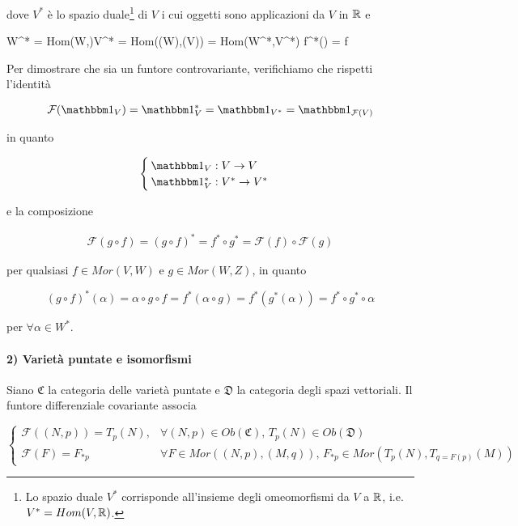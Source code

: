 dove $ V^{*} $ è lo spazio duale\footnote{%
	Lo spazio duale $ V^{*} $ corrisponde all'insieme degli omeomorfismi da $ V $ a $ \mathbb{R} $, i.e. $ V^{*} = Hom(V,\mathbb{R}) $.%
} di $ V $ i cui oggetti sono applicazioni da $ V $ in $ \mathbb{R} $ e

	{W^{*} = Hom(W,\R)}{V^{*} = Hom((W),(V)) = Hom(W^{*},V^{*})}
	{\alpha}{f^{*}(\alpha) = \alpha \circ f}

Per dimostrare che sia un funtore controvariante, verifichiamo che rispetti l'identità

\begin{align}
	\mathcal{F}(\bigone_{V}) = \bigone_{V}^{*} %
	= \bigone_{V^{*}} %
	= \bigone_{\mathcal{F}(V)}
\end{align}

in quanto

\begin{equation}
	\begin{cases}
		\bigone_{V} : V \to V\\
		\bigone_{V}^{*} : V^{*} \to V^{*}
	\end{cases}
\end{equation}

e la composizione

\begin{align}
	\mathcal{F}(g \circ f) = (g \circ f)^{*} %
	= f^{*} \circ g^{*} %
	= \mathcal{F}(f) \circ \mathcal{F}(g)
\end{align}

per qualsiasi $ f \in Mor(V,W) $ e $ g \in Mor(W,Z) $, in quanto

\begin{equation}
	(g \circ f)^{*}(\alpha) = \alpha \circ g \circ f %
	= f^{*} (\alpha \circ g) %
	= f^{*} (g^{*}(\alpha)) %
	= f^{*} \circ g^{*} \circ \alpha
\end{equation}

per $ \forall \alpha \in W^{*} $.

\paragraph{2) Varietà puntate e isomorfismi}

Siano $ \mathfrak{C} $ la categoria delle varietà puntate e $ \mathfrak{D} $ la categoria degli spazi vettoriali. Il funtore differenziale covariante associa

\begin{equation}
	\begin{cases}
		\mathcal{F}((N,p)) = T_{p}(N), & \forall (N,p) \in Ob(\mathfrak{C}), \, T_{p}(N) \in Ob(\mathfrak{D})\\
		\mathcal{F}(F) = F_{*p} & \forall F \in Mor((N,p),(M,q)), \, F_{*p} \in Mor(T_{p}(N),T_{q=F(p)}(M))
	\end{cases}
\end{equation}

